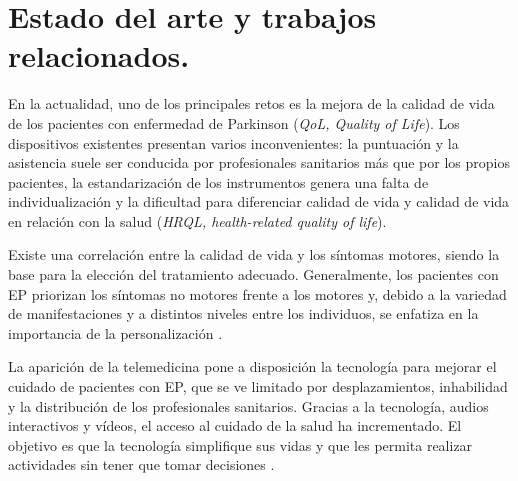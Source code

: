




\section{Estado del arte y trabajos relacionados.}


En la actualidad, uno de los principales retos es la mejora de la calidad de vida de los pacientes con enfermedad de Parkinson (\textit{QoL, Quality of Life}). Los dispositivos existentes presentan varios inconvenientes: la puntuación y la asistencia suele ser conducida por profesionales sanitarios más que por los propios pacientes, la estandarización de los instrumentos genera una falta de individualización y la dificultad para diferenciar calidad de vida y calidad de vida en relación con la salud (\textit{HRQL, health-related quality of life}).

Existe una correlación entre la calidad de vida y los síntomas motores, siendo la base para la elección del tratamiento adecuado. Generalmente, los pacientes con EP priorizan los síntomas no motores frente a los motores y, debido a la variedad de manifestaciones y a distintos niveles entre los individuos, se enfatiza en la importancia de la personalización \cite{stamford2015engineering}.

La aparición de la telemedicina pone a disposición la tecnología para mejorar el cuidado de pacientes con EP, que se ve limitado por desplazamientos, inhabilidad y la distribución de los profesionales sanitarios. Gracias a la tecnología, audios interactivos y vídeos, el acceso al cuidado de la salud ha incrementado. El objetivo es que la tecnología simplifique sus vidas y que les permita realizar actividades sin tener que tomar decisiones \cite{achey2014past, stamford2015engineering}.


